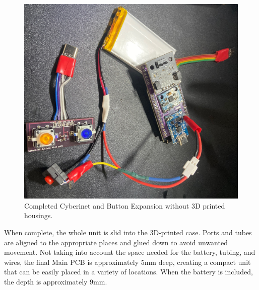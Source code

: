 \begin{center}
    \begin{figure}
        \centering
        \includegraphics[scale=0.1, angle=90]{diagrams/builtUnits/noCase.JPG}
        \caption{Completed Cyberinet and Button Expansion without 3D printed housings.}
        \label{fig:CyberinetNoCase}
    \end{figure}
\end{center}

When complete, the whole unit is slid into the 3D-printed case. Ports and tubes are aligned to the appropriate places and glued down to avoid unwanted movement. Not taking into account the space needed for the battery, tubing, and wires, the final Main PCB is approximately 5mm deep, creating a compact unit that can be easily placed in a variety of locations. When the battery is included, the depth is approximately 9mm.

